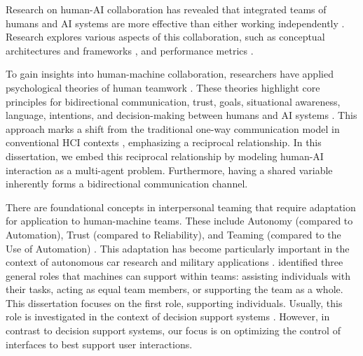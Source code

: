Research on human-AI collaboration has revealed that integrated teams of humans and AI systems are more effective than either working independently \cite{bansal2019beyond, bansal2019updates, demir2018conceptual}. Research explores various aspects of this collaboration, such as conceptual architectures and frameworks \cite{johnson2019ai, madni2018architectural, oneill2020human, prada2014human}, and performance metrics \cite{bansal2019beyond}.

To gain insights into human-machine collaboration, researchers have applied psychological theories of human teamwork \cite{devisser2018automation, mou2017media}. These theories highlight core principles for bidirectional communication, trust, goals, situational awareness, language, intentions, and decision-making between humans and AI systems \cite{demir2017team, shively2017human}. This approach marks a shift from the traditional one-way communication model in conventional HCI contexts \cite{xu2023transitioning}, emphasizing a reciprocal relationship. In this dissertation, we embed this reciprocal relationship by modeling human-AI interaction as a multi-agent problem. Furthermore, having a shared variable inherently forms a bidirectional communication channel.

There are foundational concepts in interpersonal teaming that require adaptation for application to human-machine teams. These include Autonomy (compared to Automation), Trust (compared to Reliability), and Teaming (compared to the Use of Automation) \cite{greenberg2023foundational}. This adaptation has become particularly important in the context of autonomous car research \cite{li2016trolley, awad2018moral} and military applications \cite{chen2014human}. \citet{sycara2004integrating} identified three general roles that machines can support within teams: assisting individuals with their tasks, acting as equal team members, or supporting the team as a whole. This dissertation focuses on the first role, supporting individuals. Usually, this role is investigated in the context of decision support systems \cite{lyons2021humanautonomy}. However, in contrast to decision support systems, our focus is on optimizing the control of interfaces to best support user interactions.